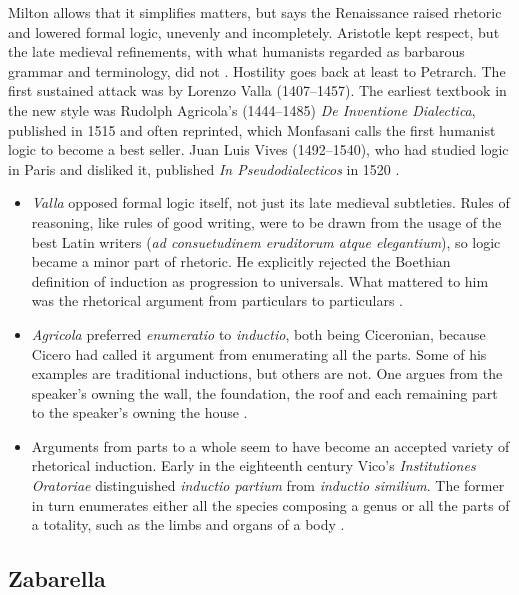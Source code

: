 Milton allows that it simplifies matters, but says the Renaissance raised
rhetoric and lowered formal logic, unevenly and incompletely. Aristotle
kept respect, but the late medieval refinements, with what humanists
regarded as barbarous grammar and terminology, did not
\cite[p.~20]{Milton2011InductionBeforeHume}. Hostility goes back at least
to Petrarch. The first sustained attack was by Lorenzo Valla (1407--1457).
The earliest textbook in the new style was Rudolph Agricola's (1444--1485)
\emph{De Inventione Dialectica}, published in 1515 and often reprinted,
which Monfasani calls the first humanist logic to become a best seller.
Juan Luis Vives (1492--1540), who had studied logic in Paris and disliked
it, published \emph{In Pseudodialecticos} in 1520
\cite[p.~20]{Milton2011InductionBeforeHume}.

\begin{itemize}
\item \emph{Valla} opposed formal logic itself, not just its late medieval
  subtleties. Rules of reasoning, like rules of good writing, were to be
  drawn from the usage of the best Latin writers (\emph{ad consuetudinem
  eruditorum atque elegantium}), so logic became a minor part of rhetoric.
  He explicitly rejected the Boethian definition of induction as progression
  to universals. What mattered to him was the rhetorical argument from
  particulars to particulars \cite[pp.~20--21]{Milton2011InductionBeforeHume}.
\item \emph{Agricola} preferred \emph{enumeratio} to \emph{inductio}, both
  being Ciceronian, because Cicero had called it argument from enumerating
  all the parts. Some of his examples are traditional inductions, but
  others are not. One argues from the speaker's owning the wall, the
  foundation, the roof and each remaining part to the speaker's owning
  the house
  \cite[p.~21]{Milton2011InductionBeforeHume}.
\item Arguments from parts to a whole seem to have become an accepted
  variety of rhetorical induction. Early in the eighteenth century Vico's
  \emph{Institutiones Oratoriae} distinguished \emph{inductio partium}
  from \emph{inductio similium}. The former in turn enumerates either all
  the species composing a genus or all the parts of a totality, such as
  the limbs and organs of a body \cite[p.~21]{Milton2011InductionBeforeHume}.
\end{itemize}

\subsection{Zabarella}

